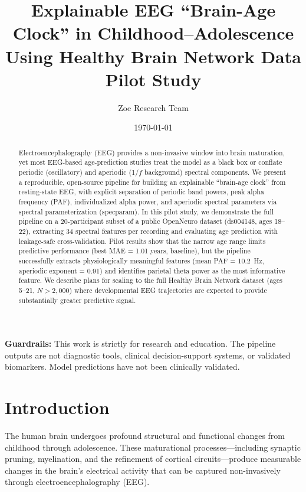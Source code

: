 \documentclass[12pt, a4paper]{article}
\title{Explainable EEG ``Brain-Age Clock'' in Childhood--Adolescence\\Using Healthy Brain Network Data\\[0.5em]\large Pilot Study}
\author{Zoe Research Team}
\date{\today}
\begin{document}
\maketitle

\begin{abstract}
Electroencephalography (EEG) provides a non-invasive window into brain maturation, yet most EEG-based age-prediction studies treat the model as a black box or conflate periodic (oscillatory) and aperiodic (1/$f$ background) spectral components.
We present a reproducible, open-source pipeline for building an explainable ``brain-age clock'' from resting-state EEG, with explicit separation of periodic band powers, peak alpha frequency (PAF), individualized alpha power, and aperiodic spectral parameters via spectral parameterization (specparam).
In this pilot study, we demonstrate the full pipeline on a 20-participant subset of a public OpenNeuro dataset (ds004148, ages 18--22), extracting 34 spectral features per recording and evaluating age prediction with leakage-safe cross-validation.
Pilot results show that the narrow age range limits predictive performance (best MAE = 1.01 years, baseline), but the pipeline successfully extracts physiologically meaningful features (mean PAF = 10.2~Hz, aperiodic exponent = 0.91) and identifies parietal theta power as the most informative feature.
We describe plans for scaling to the full Healthy Brain Network dataset (ages 5--21, $N > 2{,}000$) where developmental EEG trajectories are expected to provide substantially greater predictive signal.
\end{abstract}

\vspace{1em}
\noindent\textbf{Guardrails:} This work is strictly for research and education. The pipeline outputs are not diagnostic tools, clinical decision-support systems, or validated biomarkers. Model predictions have not been clinically validated.

\section{Introduction}

The human brain undergoes profound structural and functional changes from childhood through adolescence. These maturational processes---including synaptic pruning, myelination, and the refinement of cortical circuits---produce measurable changes in the brain's electrical activity that can be captured non-invasively through electroencephalography (EEG).
\end{document}
